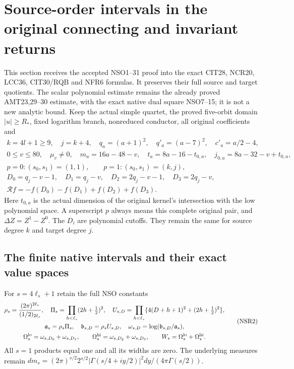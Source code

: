 \documentclass[11pt,a4paper]{article}
\begin{document}
\section{Source-order intervals in the original connecting and invariant returns}
\label{sec:NSR}
This section receives the accepted NSO1--31 proof into the exact
CIT28, NCR20, LCC36, CIT30/RQB and NFR6 formulas. It preserves
their full source and target quotients. The scalar polynomial
estimate remains the already proved AMT23,29--30 estimate, with
the exact native dual square NSO7--15; it is not a new analytic
bound. Keep the actual simple quartet, the proved five-orbit
domain $|u|\ge R_*$, fixed logarithm branch, nonreduced conductor,
all original coefficients and
\[
 \begin{gathered}
 k=4l+1\ge9,\quad j=k+4,\quad q_a=(a+1)^2,\quad q'_a=(a-7)^2,
 \quad c'_a=a/2-4,\\
 0\le v\le80,\quad \mu_v\ne0,\quad
 m_a=16a-48-v,\quad
 t_a=8a-16-t_{0,a},\quad j_{0,a}=8a-32-v+t_{0,a},\\
 p=0:(s_0,s_1)=(1,1),\qquad p=1:(s_0,s_1)=(k,j),\\
 D_0=q_j-v-1,\quad D_1=q_j-v,\quad
 D_2=2q_j-v-1,\quad D_3=2q_j-v,\\
 \mathcal Rf=-f(D_0)-f(D_1)+f(D_2)+f(D_3).
 \end{gathered}\tag{NSR1}
\]
Here $t_{0,a}$ is the actual dimension of the original kernel's
intersection with the low polynomial space. A superscript $p$
always means this complete original pair, and
$\Delta Z=Z^1-Z^0$. The $D_i$ are polynomial cutoffs.
They remain the same for source degree $k$ and target degree $j$.

\subsection{The finite native intervals and their exact value spaces}
For $s=4\ell_s+1$ retain the full NSO constants
\[
 \begin{gathered}
 \rho_s=\frac{(2\pi)^{2\ell_s}}{(1/2)_{2\ell_s}},\quad
 \Pi_s=\prod_{h<\ell_s}(2h+\tfrac12)^2,\quad
 U_{s,D}=\prod_{h<\ell_s}\{4(D+h+1)^2+(2h+\tfrac12)^2\},\\
 \mathfrak a_s=\rho_s\Pi_s,\quad
 \mathfrak b_{s,D}=\rho_sU_{s,D},\quad
 \omega_{s,D}=\log(\mathfrak b_{s,D}/\mathfrak a_s),\\
 \Omega_s^{\rm lo}=\omega_{s,D_0}+\omega_{s,D_1},\qquad
 \Omega_s^{\rm hi}=\omega_{s,D_2}+\omega_{s,D_3},\qquad
 W_s=\Omega_s^{\rm lo}+\Omega_s^{\rm hi}.
 \end{gathered}\tag{NSR2}
\]
All $s=1$ products equal one and all its widths are zero.
The underlying measures remain
$dm_s=(2\pi)^{s/2}2^{s/2}|\Gamma(s/4+iy/2)|^2
dy/(4\pi\Gamma(s/2))$.
\end{document}
